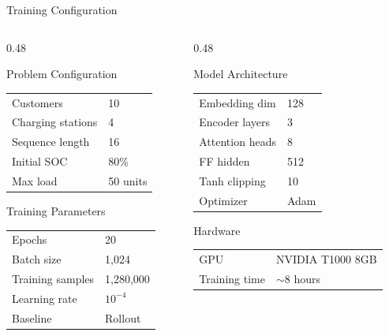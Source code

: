 \documentclass[aspectratio=169,11pt]{beamer}
\begin{document}
\begin{frame}{Training Configuration}
    \begin{columns}[T]
        \begin{column}{0.48\textwidth}
            \begin{block}{Problem Configuration}
                \begin{tabular}{ll}
                    Customers & 10 \\
                    Charging stations & 4 \\
                    Sequence length & 16 \\
                    Initial SOC & 80\% \\
                    Max load & 50 units
                \end{tabular}
            \end{block}

            \begin{block}{Training Parameters}
                \begin{tabular}{ll}
                    Epochs & 20 \\
                    Batch size & 1,024 \\
                    Training samples & 1,280,000 \\
                    Learning rate & $10^{-4}$ \\
                    Baseline & Rollout
                \end{tabular}
            \end{block}
        \end{column}
        \begin{column}{0.48\textwidth}
            \begin{block}{Model Architecture}
                \begin{tabular}{ll}
                    Embedding dim & 128 \\
                    Encoder layers & 3 \\
                    Attention heads & 8 \\
                    FF hidden & 512 \\
                    Tanh clipping & 10 \\
                    Optimizer & Adam
                \end{tabular}
            \end{block}

            \begin{block}{Hardware}
                \begin{tabular}{ll}
                    GPU & NVIDIA T1000 8GB \\
                    Training time & $\sim$8 hours
                \end{tabular}
            \end{block}
        \end{column}
    \end{columns}
\end{frame}
\end{document}
